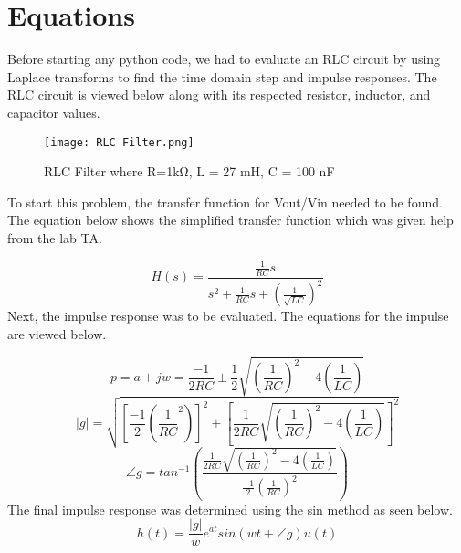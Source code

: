 \documentclass[12pt]{report}
\begin{document}
\section{Equations}
\hspace{\parindent}Before starting any python code, we had to evaluate an RLC circuit by using Laplace transforms to find the time domain step and impulse responses. The RLC circuit is viewed below along with its respected resistor, inductor, and capacitor values. \par
\begin{figure}[h!]
    \centering
    \texttt{[image: RLC Filter.png]}
    \caption{RLC Filter where R=1kΩ, L = 27 mH, C = 100 nF}
    \label{Figure x:}
\end{figure}
\hspace{\parindent}To start this problem, the transfer function for Vout/Vin needed to be found. The equation below shows the simplified transfer function which was given help from the lab TA. \par
\[H(s) = \frac{\frac{1}{RC}s}{s^2+\frac{1}{RC}s + (\frac{1}{\sqrt{LC}})^2}\]
\hspace{\parindent}Next, the impulse response was to be evaluated. The equations for the impulse are viewed below. \par
\[p = a +jw = \frac{-1}{2RC} ± \frac{1}{2}\sqrt{(\frac{1}{RC})^2 - 4(\frac{1}{LC})}\]
\[|g| = \sqrt{[\frac{-1}{2}(\frac{1}{RC}^2)]^2+[\frac{1}{2RC}\sqrt{(\frac{1}{RC})^2-4(\frac{1}{LC})}]^2}\]
\[∠g = tan^{-1}(\frac{\frac{1}{2RC}\sqrt{(\frac{1}{RC})^2-4(\frac{1}{LC})}}{\frac{-1}{2}(\frac{1}{RC})^2})\]
The final impulse response was determined using the sin method as seen below.
\[h(t) = \frac{|g|}{w}e^{at}sin(wt + ∠g)u(t)\]
\end{document}
